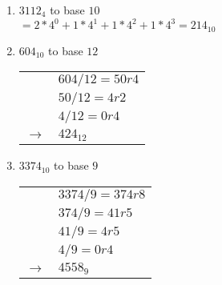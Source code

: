 \documentclass[12pt]{article}
\begin{document}
\begin{enumerate}
    \item $3112_4$ to base $10$ \\
    $= 2 * 4^0 + 1*4^1 + 1*4^2 + 1*4^3 = \boxed{214_{10}}$
    

    \item $604_{10}$ to base $12$ \\
    \begin{tabular}{l l}
        & $604 / 12 = 50  r4$ \\
        & $50 / 12 = 4  r2$ \\
        & $4 / 12 = 0  r4$ \\
        $\rightarrow$ & $\boxed{424_12}$ \\
    \end{tabular}
    

    \item $3374_{10}$ to base $9$ \\
    \begin{tabular}{l l}
        & $3374 / 9 = 374  r8$ \\
        & $374 / 9 = 41  r5$ \\
        & $41 / 9 = 4  r5$ \\
        & $4 / 9 = 0  r4$ \\
        $\rightarrow$ & $\boxed{4558_9}$ \\
    \end{tabular}

\end{enumerate}
\end{document}
